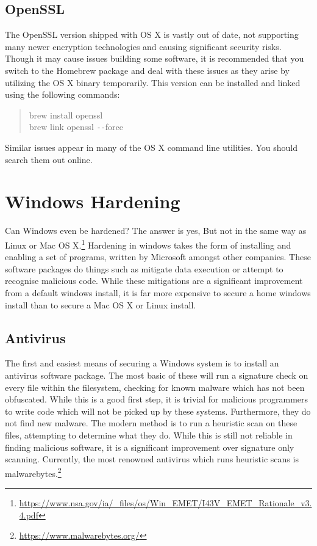 \documentclass[a4paper,11pt]{report}
\begin{document}
			\subsection{OpenSSL}
				The OpenSSL version shipped with OS X is vastly out of date, not supporting many newer encryption technologies and causing significant security risks. 
				Though it may cause issues building some software, it is recommended that you switch to the Homebrew package and deal with these issues as they arise by utilizing the OS X binary temporarily.
				This version can be installed and linked using the following commands:
				\begin{quote}
					brew install openssl \\
					brew link openssl \verb+--+force
				\end{quote}
				Similar issues appear in many of the OS X command line utilities. 
				You should search them out online. 
	\section{Windows Hardening}
		Can Windows even be hardened? The answer is yes, But not in the same way as Linux or Mac OS X.\footnote{\url{https://www.nsa.gov/ia/\_files/os/Win\_EMET/I43V\_EMET\_Rationale\_v3.4.pdf}}
		Hardening in windows takes the form of installing and enabling a set of programs, written by Microsoft amongst other companies. 
		These software packages do things such as mitigate data execution or attempt to recognise malicious code. 
		While these mitigations are a significant improvement from a default windows install, it is far more expensive to secure a home windows install than to secure a Mac OS X or Linux install. 
		\subsection{Antivirus}
			The first and easiest means of securing a Windows system is to install an antivirus software package. 
			The most basic of these will run a signature check on every file within the filesystem, checking for known malware which has not been obfuscated. 
			While this is a good first step, it is trivial for malicious programmers to write code which will not be picked up by these systems. 
			Furthermore, they do not find new malware.
			The modern method is to run a heuristic scan on these files, attempting to determine what they do. 
			While this is still not reliable in finding malicious software, it is a significant improvement over signature only scanning. 
			Currently, the most renowned antivirus which runs heuristic scans is malwarebytes.\footnote{\url{https://www.malwarebytes.org/}}
\end{document}
